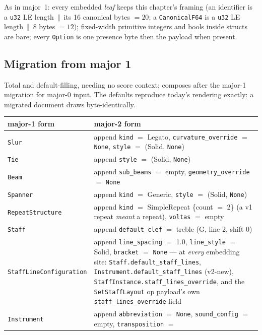 \documentclass[11pt,letterpaper]{report}
\newcommand{\cat}{\ensuremath{\,\Vert\,}}
\begin{document}
As in major~1: every embedded \emph{leaf} keeps this chapter's framing
(an identifier is a \texttt{u32} LE length \cat{} its 16 canonical
bytes $= 20$; a \texttt{CanonicalF64} is a \texttt{u32} LE length
\cat{} 8 bytes $= 12$); fixed-width primitive integers and bools inside
structs are bare; every \texttt{Option} is one presence byte then the
payload when present.

\subsection{Migration from major 1}
Total and default-filling, needing no score context; composes after the
major-1 migration for major-0 input. The defaults reproduce today's
rendering exactly: a migrated document draws byte-identically.

\begin{center}
\begin{tabular}{p{1.9in} p{3.4in}}
  \toprule
  \textbf{major-1 form} & \textbf{major-2 form} \\
  \midrule
  \texttt{Slur} & append \texttt{kind} $=$ Legato,
    \texttt{curvature\_override} $=$ \texttt{None}, \texttt{style} $=$
    (Solid, \texttt{None}) \\
  \texttt{Tie} & append \texttt{style} $=$ (Solid, \texttt{None}) \\
  \texttt{Beam} & append \texttt{sub\_beams} $=$ empty,
    \texttt{geometry\_override} $=$ \texttt{None} \\
  \texttt{Spanner} & append \texttt{kind} $=$ Generic, \texttt{style}
    $=$ (Solid, \texttt{None}) \\
  \texttt{RepeatStructure} & append \texttt{kind} $=$ SimpleRepeat
    \{count $=$ 2\} (a v1 repeat \emph{meant} a repeat), \texttt{voltas}
    $=$ empty \\
  \texttt{Staff} & append \texttt{default\_clef} $=$ treble
    (G, line 2, shift 0) \\
  \texttt{StaffLineConfiguration} & append \texttt{line\_spacing} $=$
    1.0, \texttt{line\_style} $=$ Solid, \texttt{bracket} $=$
    \texttt{None} --- at \emph{every} embedding site:
    \texttt{Staff.default\_staff\_lines},
    \texttt{Instrument.default\_staff\_lines} (v2-new),
    \texttt{StaffInstance.staff\_lines\_override}, and the
    \texttt{SetStaffLayout} op payload's own
    \texttt{staff\_lines\_override} field \\
  \texttt{Instrument} & append \texttt{abbreviation} $=$ \texttt{None},
    \texttt{sound\_config} $=$ empty, \texttt{transposition} $=$

\end{tabular}
\end{center}
\end{document}
